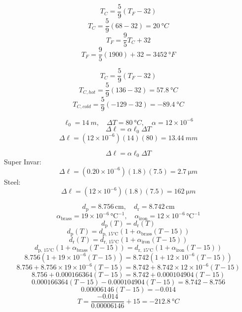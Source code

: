 \documentclass[11pt]{homework}
\begin{document}
\maketitle

\renewcommand{\questiontype}{Problem}

\setcounter{questionCounter}{2}
\question
\begin{alphaparts}
\questionpart
\[
T_{C} =\frac{5}{9}(T_{F}-32)
\]
\[
T_C = \frac{5}{9}(68-32) = \boxed{\qty{20}{\degree C}}
\]
\questionpart
\[
T_{F}=\frac{9}{5}T_{C}+32
\]
\[
T_F = \frac{9}{5}(1900)+32 = \boxed{\qty{3452}{\degree F}}
\]
\end{alphaparts}

\question
\[
T_{C} =\frac{5}{9}(T_{F}-32)
\]
\[
    T_{C,hot}=\frac{5}{9}(136-32) = \boxed{\qty{57.8}{\degree C}}
\]
\[
    T_{C,cold}=\frac{5}{9}(-129-32) = \boxed{\qty{-89.4}{\degree C}}
\]

\setcounter{questionCounter}{7}
\question
\[
    \ell_0 = \qty{14}{m}, \quad \Delta T = \qty{80}{\degree C}, \quad \alpha = 12 \times 10^{-6}
\]
\[
\Delta \ell=\alpha \ell_{0} \Delta T
\]
\[
    \Delta \ell=(12\times 10^{-6})(14)(80) = \boxed{\qty{13.44}{mm}}
\]



\setcounter{questionCounter}{9}
\question
\[
\Delta \ell=\alpha \ell_{0} \Delta T
\]
Super Invar:
\[
    \Delta \ell=(0.20 \times 10^{-6})(1.8)(7.5) = \boxed{\qty{2.7}{\micro m}}
\]
Steel:
\[
    \Delta \ell=(12 \times 10^{-6})(1.8)(7.5) = \boxed{\qty{162}{\micro m}}
\]



\setcounter{questionCounter}{19}
\question
\[
d_{\text{p}} = 8.756 \, \text{cm}, \quad d_{\text{r}} = 8.742 \, \text{cm}
\]
\[
\alpha_{\text{brass}} = 19 \times 10^{-6} \, \text{°C}^{-1}, \quad \alpha_{\text{iron}} = 12 \times 10^{-6} \, \text{°C}^{-1}
\]
\[
d_{\text{p}}(T) = d_{\text{r}}(T)
\]
\[
d_{\text{p}}(T) = d_{\text{p, 15°C}} \left(1 + \alpha_{\text{brass}} (T - 15)\right)
\]
\[
d_{\text{r}}(T) = d_{\text{r, 15°C}} \left(1 + \alpha_{\text{iron}} (T - 15)\right)
\]
\[
d_{\text{p, 15°C}} \left(1 + \alpha_{\text{brass}} (T - 15)\right) = d_{\text{r, 15°C}} \left(1 + \alpha_{\text{iron}} (T - 15)\right)
\]
\[
8.756 \left(1 + 19 \times 10^{-6} (T - 15)\right) = 8.742 \left(1 + 12 \times 10^{-6} (T - 15)\right)
\]
\[
8.756 + 8.756 \times 19 \times 10^{-6} (T - 15) = 8.742 + 8.742 \times 12 \times 10^{-6} (T - 15)
\]
\[
8.756 + 0.000166364 (T - 15) = 8.742 + 0.000104904 (T - 15)
\]
\[
0.000166364 (T - 15) - 0.000104904 (T - 15) = 8.742 - 8.756
\]
\[
0.00006146 (T - 15) = -0.014
\]
\[
T= \frac{-0.014}{0.00006146} + 15=  \boxed{\qty{-212.8}{\degree C}}
\]
\end{document}
